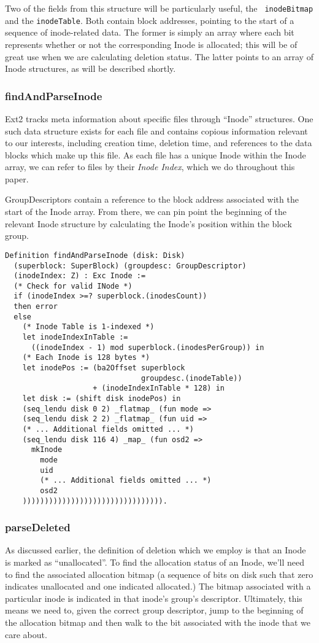 \documentclass[nocopyrightspace]{sigplanconf}
\begin{document}
Two of the fields from this structure will be particularly useful, the {\tt
inodeBitmap} and the {\tt inodeTable}. Both contain block addresses, pointing
to the start of a sequence of inode-related data. The former is simply an
array where each bit represents whether or not the corresponding Inode is
allocated; this will be of great use when we are calculating deletion status.
The latter points to an array of Inode structures, as will be described
shortly.

\subsubsection{findAndParseInode}

Ext2 tracks meta information about specific files through ``Inode''
structures. One such data structure exists for each file and contains copious
information relevant to our interests, including creation time, deletion time,
and references to the data blocks which make up this file. As each file has a
unique Inode within the Inode array, we can refer to files by their {\it Inode
Index}, which we do throughout this paper.

GroupDescriptors contain a reference to the block address associated with the
start of the Inode array. From there, we can pin point the beginning of the
relevant Inode structure by calculating the Inode's position within the block
group.

\begin{lstlisting}
Definition findAndParseInode (disk: Disk) 
  (superblock: SuperBlock) (groupdesc: GroupDescriptor)
  (inodeIndex: Z) : Exc Inode :=
  (* Check for valid INode *)
  if (inodeIndex >=? superblock.(inodesCount))
  then error
  else
    (* Inode Table is 1-indexed *)
    let inodeIndexInTable := 
      ((inodeIndex - 1) mod superblock.(inodesPerGroup)) in
    (* Each Inode is 128 bytes *)
    let inodePos := (ba2Offset superblock
                               groupdesc.(inodeTable))
                    + (inodeIndexInTable * 128) in
    let disk := (shift disk inodePos) in
    (seq_lendu disk 0 2) _flatmap_ (fun mode =>
    (seq_lendu disk 2 2) _flatmap_ (fun uid =>
    (* ... Additional fields omitted ... *)
    (seq_lendu disk 116 4) _map_ (fun osd2 =>
      mkInode
        mode
        uid
        (* ... Additional fields omitted ... *)
        osd2
    )))))))))))))))))))))))))))))))).
\end{lstlisting}


\subsubsection{parseDeleted}
As discussed earlier, the definition of deletion which we employ is that an
Inode is marked as ``unallocated''. To find the allocation status of an Inode,
we'll need to find the associated allocation bitmap (a sequence of bits on
disk such that zero indicates unallocated and one indicated allocated.) The
bitmap associated with a particular inode is indicated in that inode's group's
descriptor. Ultimately, this means we need to, given the correct group
descriptor, jump to the beginning of the allocation bitmap and then walk to
the bit associated with the inode that we care about.
\end{document}
